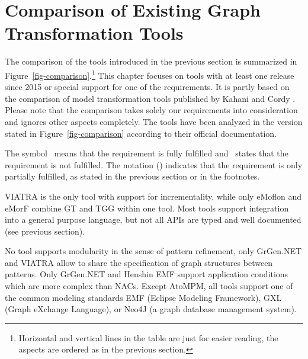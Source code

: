 \section{Comparison of Existing Graph Transformation Tools}
\label{comparison}
The comparison of the tools introduced in the previous section is summarized in Figure~\ref{fig-comparison}.\footnote{Horizontal and vertical lines in the table are just for easier reading, the aspects are ordered as in the previous section.}
This chapter focuses on tools with at least one release since 2015 or special support for one of the requirements.
It is partly based on the comparison of model transformation tools published by Kahani and Cordy \cite{ComparisonAndEvaluationOfModelTransformationTools, ComparisonOfModelTransformationToolsWebsite}.
Please note that the comparison takes solely our requirements into consideration and ignores other aspects completely.
The tools have been analyzed in the version stated in Figure~\ref{fig-comparison} according to their official documentation.

The symbol \yes~means that the requirement is fully fulfilled and \no~states that the requirement is not fulfilled.
The notation (\yes) indicates that the requirement is only partially fulfilled, as stated in the previous section or in the footnotes.

VIATRA is the only tool with support for incrementality, while only eMoflon and eMorF combine GT and TGG within one tool.
Most tools support integration into a general purpose language, but not all APIs are typed and well documented (see previous section).

No tool supports modularity in the sense of pattern refinement, only GrGen.NET and VIATRA allow to share the specification of graph structures between patterns.
Only GrGen.NET and Henshin EMF support application conditions which are more complex than NACs.
Except AtoMPM, all tools support one of the common modeling standards EMF (Eclipse Modeling Framework), GXL (Graph eXchange Language), or Neo4J (a graph database management system).

